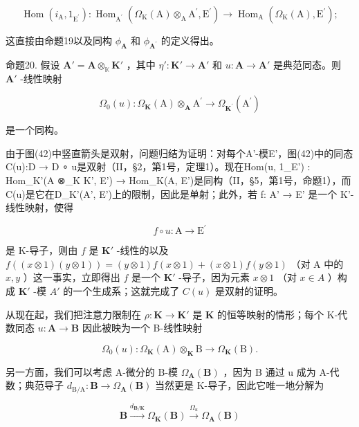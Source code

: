 \[
\operatorname{Hom} \left(i _ {\mathrm{A}}, 1 _ {\mathrm{E} ^ {\prime}}\right): \operatorname{Hom} _ {\mathrm{A} ^ {\prime}} \left(\Omega_ {\mathrm{K}} (\mathrm{A}) \otimes_ {\mathrm{A}} \mathrm{A} ^ {\prime}, \mathrm{E} ^ {\prime}\right)\rightarrow \operatorname{Hom} _ {\mathrm{A}} \left(\Omega_ {\mathrm{K}} (\mathrm{A}), \mathrm{E} ^ {\prime}\right);
\]

这直接由命题19以及同构 \(\phi_{\mathbf{A}}\) 和 \(\phi_{\mathbf{A}^{\prime}}\) 的定义得出。

命题20. 假设 \(\mathbf{A}' = \mathbf{A} \otimes_{\mathbb{K}} \mathbf{K}'\) ，其中 \(\eta': \mathbf{K}' \to \mathbf{A}'\) 和 \(u: \mathbf{A} \to \mathbf{A}'\) 是典范同态。则 \(\mathbf{A}'\) -线性映射

\[
\Omega_ {0} (u): \Omega_ {\mathbf {K}} (\mathrm{A}) \otimes_ {\mathbf {A}} \mathrm{A} ^ {\prime} \rightarrow \Omega_ {\mathbf {K} ^ {\prime}} (\mathrm{A} ^ {\prime})
\]

是一个同构。

由于图(42)中竖直箭头是双射，问题归结为证明：对每个A'-模E'，图(42)中的同态C(u):D → D ∘ u是双射（II，§2，第1号，定理1）。现在Hom(u, 1\_E') : Hom\_K'(A ⊗\_K K', E') → Hom\_K(A, E')是同构（II，§5，第1号，命题1），而C(u)是它在D\_K'(A', E')上的限制，因此是单射；此外，若 f: A' → E' 是一个 K'-线性映射，使得

\[
f \circ u: \mathrm{A} \rightarrow \mathrm{E} ^ {\prime}
\]

是 K-导子，则由 \(f\) 是 \(\mathbf{K}'\) -线性的以及 \(f((x \otimes 1)(y \otimes 1)) = (y \otimes 1)f(x \otimes 1) + (x \otimes 1)f(y \otimes 1)\) （对 A 中的 \(x, y\) ）这一事实，立即得出 \(f\) 是一个 \(\mathbf{K}'\) -导子，因为元素 \(x \otimes 1\) （对 \(x \in A\) ）构成 \(\mathbf{K}'\) -模 \(A'\) 的一个生成系；这就完成了 \(C(u)\) 是双射的证明。

从现在起，我们把注意力限制在 \(\rho: \mathbf{K} \to \mathbf{K}'\) 是 \(\mathbf{K}\) 的恒等映射的情形；每个 K-代数同态 \(u: \mathbf{A} \to \mathbf{B}\) 因此被映为一个 B-线性映射

\[
\Omega_ {0} (u): \Omega_ {\mathbf {K}} (\mathrm{A}) \otimes_ {\mathbf {K}} \mathrm{B} \rightarrow \Omega_ {\mathbf {K}} (\mathrm{B}).\tag{43}
\]

另一方面，我们可以考虑 A-微分的 B-模 \(\Omega_{\mathbf{A}}(\mathbf{B})\) ，因为 B 通过 u 成为 A-代数；典范导子 \(d_{\mathrm{B/A}}: \mathbf{B} \to \Omega_{\mathbf{A}}(\mathbf{B})\) 当然更是 K-导子，因此它唯一地分解为

\[
\mathbf {B} \xrightarrow {d _ {\mathbf {B} / \mathbf {K}}} \Omega_ {\mathbf {K}} (\mathbf {B}) \xrightarrow {\Omega_ {u}} \Omega_ {\mathbf {A}} (\mathbf {B})
\]

